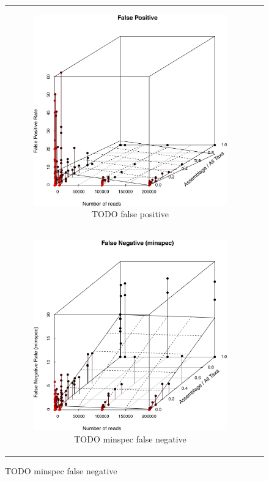 \begin{figure}
\begin{tabular}{cc}
\begin{subfigure}[b]{0.5\textwidth}
\centering
\includegraphics[width=\textwidth]{../polarfront/falsepositive.png}
\caption{TODO false positive}
\label{fig:minspecvalidationfalsepositive}
\end{subfigure}

\\
\bigskip

\begin{subfigure}[b]{0.5\textwidth}
\centering
\includegraphics[width=\textwidth]{../polarfront/minspecfalsenegative.png}
\caption{TODO minspec false negative}
\label{fig:minspecvalidationminspecfalsenegative}
\end{subfigure}


\end{tabular}
\end{figure}
